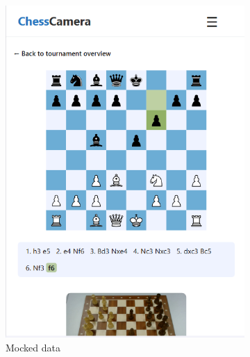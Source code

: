 \begin{figure}[h!]
    \centering
    \begin{subfigure}[h!]{0.4\linewidth}
        \centering
        \includegraphics[width=\linewidth]{figures/results/frontend/board-view/mobile.png}
        \caption{Mocked data}
        \label{fig:small-board-view}
    \end{subfigure}
    \hfill
    \begin{subfigure}[h!]{0.4\linewidth}
        \centering

\end{subfigure}
\end{figure}
